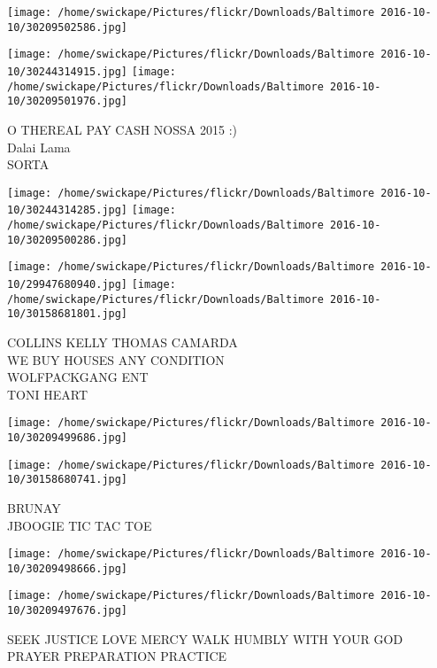 \documentclass[10pt,letterpaper]{article}
\begin{document}
\texttt{[image: /home/swickape/Pictures/flickr/Downloads/Baltimore 2016-10-10/30209502586.jpg]}

\vspace{0.25in}
\texttt{[image: /home/swickape/Pictures/flickr/Downloads/Baltimore 2016-10-10/30244314915.jpg]}
\texttt{[image: /home/swickape/Pictures/flickr/Downloads/Baltimore 2016-10-10/30209501976.jpg]}

O THEREAL PAY CASH NOSSA 2015 :)\\
Dalai Lama\\
SORTA\\
\pagebreak

\texttt{[image: /home/swickape/Pictures/flickr/Downloads/Baltimore 2016-10-10/30244314285.jpg]}
\texttt{[image: /home/swickape/Pictures/flickr/Downloads/Baltimore 2016-10-10/30209500286.jpg]}

\texttt{[image: /home/swickape/Pictures/flickr/Downloads/Baltimore 2016-10-10/29947680940.jpg]}
\texttt{[image: /home/swickape/Pictures/flickr/Downloads/Baltimore 2016-10-10/30158681801.jpg]}

COLLINS KELLY THOMAS CAMARDA\\
WE BUY HOUSES ANY CONDITION\\
WOLFPACKGANG ENT\\
TONI HEART\\
\pagebreak

\texttt{[image: /home/swickape/Pictures/flickr/Downloads/Baltimore 2016-10-10/30209499686.jpg]}

\vspace{0.25in}
\texttt{[image: /home/swickape/Pictures/flickr/Downloads/Baltimore 2016-10-10/30158680741.jpg]}

BRUNAY\\
JBOOGIE TIC TAC TOE\\
\pagebreak

\texttt{[image: /home/swickape/Pictures/flickr/Downloads/Baltimore 2016-10-10/30209498666.jpg]}

\vspace{0.25in}
\texttt{[image: /home/swickape/Pictures/flickr/Downloads/Baltimore 2016-10-10/30209497676.jpg]}

SEEK JUSTICE LOVE MERCY WALK HUMBLY WITH YOUR GOD\\
PRAYER PREPARATION PRACTICE\\
\pagebreak
\end{document}
